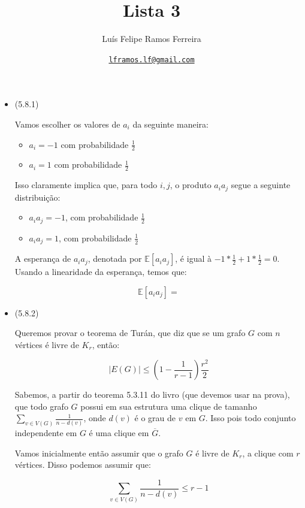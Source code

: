 \documentclass{article}
\title{Lista 3}
\author{Luís Felipe Ramos Ferreira}
\date{\href{mailto:lframos.lf@gmail.com}{\texttt{lframos.lf@gmail.com}}
}
\begin{document}
\maketitle

\begin{itemize}
	\item (5.8.1)

	      Vamos escolher os valores de \(a_i\) da seguinte maneira:
	      \begin{itemize}
		      \item \(a_i = -1\) com probabilidade \(\frac{1}{2}\)
		      \item \(a_i = 1\) com probabilidade \(\frac{1}{2}\)
	      \end{itemize}

	      Isso claramente implica que, para todo \(i, j\), o produto \(a_i a_j\) segue a seguinte distribuição:

	      \begin{itemize}
		      \item \(a_i a_j = -1\), com probabilidade \(\frac{1}{2}\)
		      \item \(a_i a_j = 1\), com probabilidade \(\frac{1}{2}\)
	      \end{itemize}

	      A esperança de \(a_i a_j\), denotada por \(\mathbb{E}[a_i a_j]\), é igual à \(-1 * \frac{1}{2} + 1 * \frac{1}{2} = 0\). Usando a linearidade
	      da esperança, temos que:

	      \[\mathbb{E}[a_i a_j] = \]

	\item (5.8.2)

	      Queremos provar o teorema de Turán, que diz que se um grafo \(G\) com \(n\) vértices é livre de \(K_r\), então:

	      \[|E(G)| \leq (1 - \frac{1}{r-1})\frac{r^2}{2}\]

	      Sabemos, a partir do teorema 5.3.11 do livro (que devemos usar na prova), que todo grafo \(G\) possui em sua estrutura uma clique de tamanho \(\sum_{v \in V(G)} \frac{1}{n - d(v)}\),
	      onde \(d(v)\) é o grau de \(v\) em \(G\). Isso pois todo conjunto independente em \(G\) é uma clique em \(\overline{G}\).

	      Vamos inicialmente então assumir que o grafo \(G\) é livre de \(K_r\), a clique com \(r\) vértices. Disso podemos assumir que:

	      \[\sum_{v \in V(G)} \frac{1}{n - d(v)} \leq r -1\]


\end{itemize}
\end{document}

